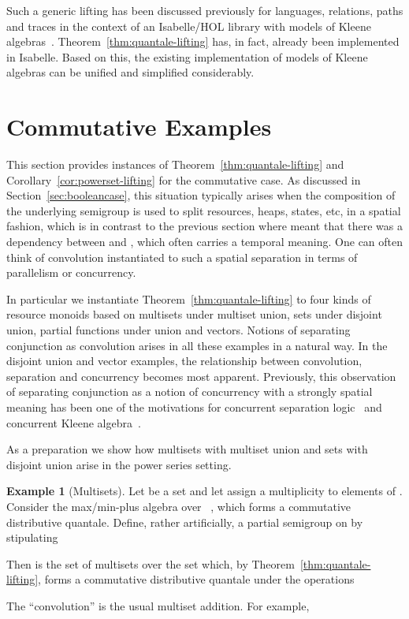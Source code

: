 \documentclass[12pt]{article}
\theoremstyle{definition}
\newtheorem{example}{Example}
\begin{document}
Such a generic lifting has been discussed previously for languages,
relations, paths and traces in the context of an Isabelle/HOL library
with models of Kleene
algebras~\cite{ArmstrongSW-JLAMP,ArmstrongSW13}. Theorem~\ref{thm:quantale-lifting}
has, in fact, already been implemented in Isabelle.  Based on this,
the existing implementation of models of Kleene algebras can be
unified and simplified considerably.








\section{Commutative Examples}\label{sec:fpscomquantaleexamples}

This section provides instances of Theorem~\ref{thm:quantale-lifting}
and Corollary~\ref{cor:powerset-lifting} for the commutative case. As
discussed in Section~\ref{sec:booleancase},  this situation typically
arises when the composition of the underlying semigroup  is
used to split resources, heaps, states, etc, in a spatial fashion,
which is in contrast to the previous section where  meant
that there was a dependency between  and , which often carries a
temporal meaning. One can often think of convolution instantiated to
such a spatial separation in terms of parallelism or concurrency.

In particular we instantiate Theorem~\ref{thm:quantale-lifting} to
four kinds of resource monoids based on multisets under multiset
union, sets under disjoint union, partial functions under union and
vectors. Notions of separating conjunction as convolution arises in
all these examples in a natural way. In the disjoint union and vector
examples, the relationship between convolution, separation and
concurrency becomes most apparent.  Previously, this observation of
separating conjunction as a notion of concurrency with a strongly
spatial meaning has been one of the motivations for concurrent
separation logic~\cite{COY07} and concurrent Kleene
algebra~\cite{HMSW11}.

As a preparation we show how multisets with multiset union
and sets with disjoint union arise in the power series
setting.

\begin{example}[Multisets]\label{ex:multisets}
  Let  be a set and let  assign a multiplicity to
  elements of . Consider the max/min-plus algebra over
  ~\cite{GondranMinoux}, which forms a commutative
  distributive quantale. Define, rather artificially, a partial
  semigroup on  by stipulating
  
  Then  is the set of multisets over the set  which,
  by Theorem~\ref{thm:quantale-lifting}, forms a commutative
  distributive quantale under the operations
  
  The ``convolution''  is the usual multiset addition. For
  example,

\end{example}
\end{document}

